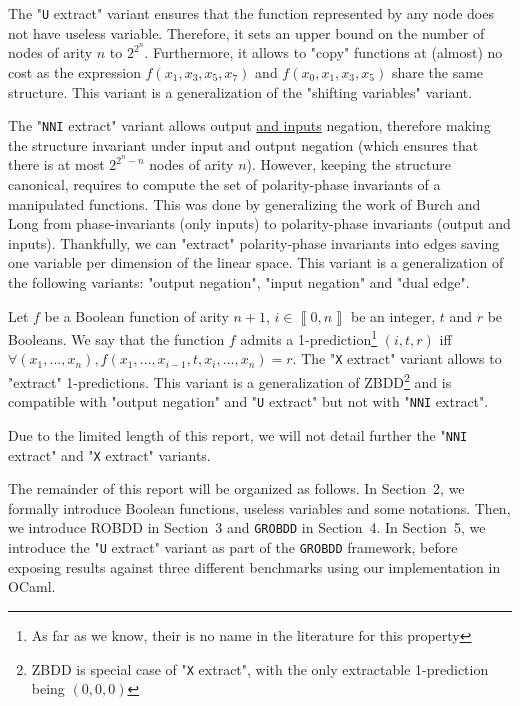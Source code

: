 \documentclass[a4paper,10pt]{article}
\newcommand{\uextract}{"\texttt{U} extract"}
\newcommand{\nniextract}{"\texttt{NNI} extract"}
\newcommand{\xextract}{"\texttt{X} extract"}
\newcommand{\GroBdd}{\texttt{GROBDD}}
\newcommand{\bras}[1]{{\left\llbracket{#1}\right\rrbracket}}
\begin{document}
The \uextract{} variant ensures that the function represented by any node does not have useless variable.
Therefore, it sets an upper bound on the number of nodes of arity $n$ to $2^{2^n}$.
Furthermore, it allows to "copy" functions at (almost) no cost as the expression $f(x_1, x_3, x_5, x_7)$ and $f(x_0, x_1, x_3, x_5)$ share the same structure.
This variant is a generalization of the "shifting variables"\cite{MinatoVariants} variant.


The \nniextract{} variant allows output \underline{and inputs} negation, therefore making the structure invariant under input and output negation (which ensures that there is at most $2^{2^n-n}$ nodes of arity $n$).
However, keeping the structure canonical, requires to compute the set of polarity-phase invariants of a manipulated functions.
This was done by generalizing the work of Burch and Long\cite{BurchLong1992} from phase-invariants (only inputs) to polarity-phase invariants (output and inputs).
Thankfully, we can "extract" polarity-phase invariants into edges saving one variable per dimension of the linear space.
This variant is a generalization of the following variants: "output negation"\cite{BryantVariantN}, "input negation"\cite{MinatoVariants} and "dual edge"\cite{RolfVariantDual}.



Let $f$ be a Boolean function of arity $n+1$, $i\in\bras{0, n}$ be an integer, $t$ and $r$ be Booleans.
We say that the function $f$ admits a 1-prediction\footnote{As far as we know, their is no name in the literature for this property} $(i, t, r)$ iff $\forall (x_1, \dots, x_n), f(x_1, \dots, x_{i-1}, t, x_i, \dots, x_n) = r$.
The \xextract{} variant allows to "extract" 1-predictions.
This variant is a generalization of ZBDD\footnote{ZBDD is special case of \xextract{}, with the only extractable 1-prediction being $(0, 0, 0)$} and is compatible with "output negation" and \uextract{} but not with \nniextract{}.

Due to the limited length of this report, we will not detail further the \nniextract{} and \xextract{} variants.

The remainder of this report will be organized as follows.
In Section~2, we formally introduce Boolean functions, useless variables and some notations.
Then, we introduce ROBDD in Section~3 and \GroBdd{} in Section~4.
In Section~5, we introduce the \uextract{} variant as part of the \GroBdd{} framework, before exposing results against three different benchmarks \cite{BenchSatlib, BenchLgsynth91, BenchIscas99} using our implementation in OCaml.
\end{document}

